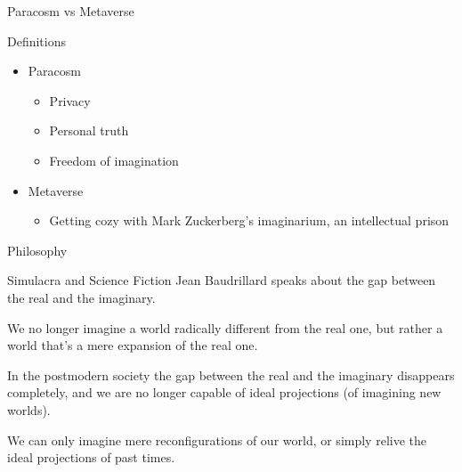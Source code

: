 \documentclass[presentation]{beamer}
\begin{document}
\begin{frame}[label={sec:org7f3bd43}]{Paracosm vs Metaverse}
\begin{block}{Definitions}
\begin{itemize}
\item Paracosm
\begin{itemize}
\item Privacy
\item Personal truth
\item Freedom of imagination
\end{itemize}
\item Metaverse
\begin{itemize}
\item Getting cozy with Mark Zuckerberg's imaginarium, an intellectual prison
\end{itemize}
\end{itemize}
\end{block}
\end{frame}

\begin{frame}[label={sec:org21f488e}]{Philosophy}
\begin{block}{Simulacra and Science Fiction}
Jean Baudrillard speaks about the gap
between the real and the imaginary.

We no longer imagine a world radically
different from the real one, but
rather a world that's a mere expansion
of the real one.

In the postmodern society the gap
between the real and the imaginary
disappears completely, and we are no
longer capable of ideal projections
(of imagining new worlds).

We can only imagine mere
reconfigurations of our world, or
simply relive the ideal projections of
past times.
\end{block}
\end{frame}
\end{document}
